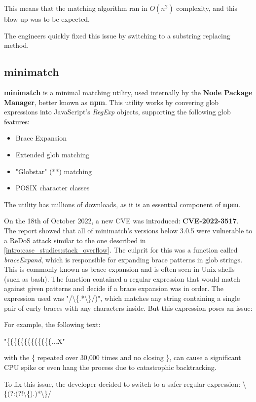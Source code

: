 This means that the matching algorithm ran in $O(n^2)$ complexity, and this blow up was to be expected.

The engineers quickly fixed this issue by switching to a substring replacing method.

\subsection{minimatch}
\textbf{minimatch} is a minimal matching utility, used internally by the \textbf{Node Package Manager}, better known as \textbf{npm}. \cite{npm_minimatch}
This utility works by convering glob expressions into JavaScript's \textit{RegExp} objects, supporting the following glob features:
\begin{itemize}
	\item Brace Expansion
	\item Extended glob matching
	\item "Globstar" (**) matching
	\item POSIX character classes
\end{itemize}
The utility has millions of downloads, as it is an essential component of \textbf{npm}.

On the 18th of October 2022, a new CVE was introduced: \textbf{CVE-2022-3517}.
The report showed that all of minimatch's versions below 3.0.5 were vulnerable to a ReDoS attack similar to the one described in \ref{intro:case_studies:stack_overflow}.
The culprit for this was a function called \textit{braceExpand}, which is responsible for expanding brace patterns in glob strings. This is commonly known as brace expansion and is often seen in Unix shells (such as bash). 
The function contained a regular expression that would match against given patterns and decide if a brace expansion was in order. The expression used was "/\textbackslash\{.*\textbackslash\}/)", which matches any string containing a single pair of curly braces with any characters inside. But this expression poses an issue:

For example, the following text:
\begin{center}
	"\{\{\{\{\{\{\{\{\{\{\{\{\{...X"
\end{center}

with the \{ repeated over 30,000 times and no closing \}, can cause a significant CPU spike or even hang the process due to catastrophic backtracking.

To fix this issue, the developer decided to switch to a safer regular expression: \textbackslash\{(?:(?!\textbackslash\{).)*\textbackslash\}/


